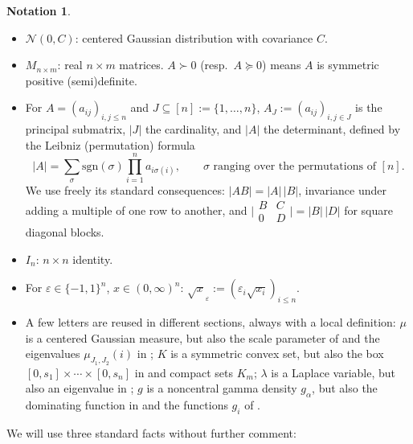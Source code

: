 \documentclass[12pt,a4paper]{article}
\theoremstyle{definition}
\newtheorem{notation}[theorem]{Notation}
\newcommand{\caln}{\mathcal{N}}
\begin{document}
\begin{notation}\label{not:conventions}
  \leavevmode
  \begin{itemize}[nosep]
    \item $\caln(0,C)$: centered Gaussian distribution with covariance
      $C$.
    \item $M_{n\times m}$: real $n\times m$ matrices.  $A\succ 0$
      (resp.\ $A\succcurlyeq 0$) means $A$ is symmetric positive
      (semi)definite.
    \item For $A=(a_{ij})_{i,j\leqslant n}$ and
      $J\subseteq[n]:=\{1,\ldots,n\}$,
      $A_J:=(a_{ij})_{i,j\in J}$ is the principal submatrix,
      $|J|$ the cardinality, and $|A|$ the determinant, defined by the
      Leibniz (permutation) formula
      \begin{equation}\label{eq:leibniz}
        |A|=\sum_{\sigma}\mathrm{sgn}(\sigma)\prod_{i=1}^{n}a_{i\sigma(i)},
        \qquad \sigma \text{ ranging over the permutations of } [n].
      \end{equation}
      We use freely its standard consequences: $|AB|=|A|\,|B|$, invariance
      under adding a multiple of one row to another, and
      $\bigl|\begin{smallmatrix}B&C\\0&D\end{smallmatrix}\bigr|=|B|\,|D|$
      for square diagonal blocks.
    \item $I_n$: $n\times n$ identity.
    \item For $\varepsilon\in\{-1,1\}^n$, $x\in(0,\infty)^n$:
      $\sqrt{x}_\varepsilon:=(\varepsilon_i\sqrt{x_i})_{i\leqslant n}$.
    \item A few letters are reused in different sections, always with a
      local definition: $\mu$ is a centered Gaussian measure, but also
      the scale parameter of  and the eigenvalues
      $\mu_{J_1,J_2}(i)$ in ; $K$ is a
      symmetric convex set, but also the box $[0,s_1]\times\cdots\times
      [0,s_n]$ in  and compact sets $K_m$; $\lambda$ is a
      Laplace variable, but also an eigenvalue in ;
      $g$ is a noncentral gamma density $g_\alpha$, but also the
      dominating function in  and the functions $g_i$ of
      .
  \end{itemize}
\end{notation}

We will use three standard facts without further comment:
\end{document}
